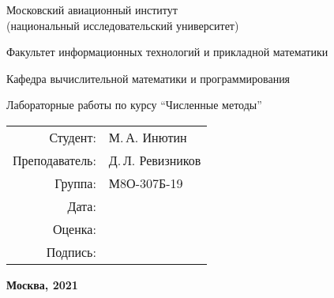 \begin{titlepage}
\begin{center}
\bfseries

{\Large Московский авиационный институт \\ (национальный исследовательский университет)

}

\vspace{48pt}

{\large Факультет информационных технологий и прикладной математики
}

\vspace{36pt}

{\large Кафедра вычислительной математики и программирования

}

\vspace{48pt}

Лабораторные работы по курсу \enquote{Численные методы}

\end{center}

\vspace{72pt}

\begin{flushright}
\begin{tabular}{rl}
Студент: & М.\,А. Инютин \\
Преподаватель: & Д.\,Л. Ревизников \\
Группа: & М8О-307Б-19 \\
Дата: & \\
Оценка: & \\
Подпись: & \\
\end{tabular}
\end{flushright}

\vfill

\begin{center}
\bfseries
Москва, 2021
\end{center}
\end{titlepage}

\pagebreak
